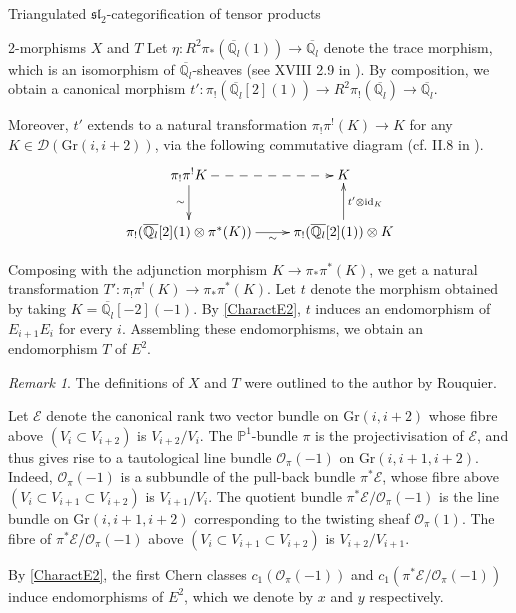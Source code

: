 \documentclass[12pt]{amsart}
\theoremstyle{definition}
\theoremstyle{remark}
\newtheorem{rmk}[thm]{Remark}
\theoremstyle{remark}
\begin{document}
\begin{section}{Triangulated $\mathfrak{sl}_{2}$-categorification of tensor products}
\begin{subsection}{2-morphisms $X$ and $T$}
Let $\eta \colon R^{2}\pi_{*}(\overline{\mathbb{Q}_{l}}(1)) \rightarrow \overline{\mathbb{Q}_{l}}$ denote the trace morphism, which is an isomorphism of $\overline{\mathbb{Q}_{l}}$-sheaves (see XVIII 2.9 in \cite{ArtinDeligneGrothendieckSaintDonatVerdierSGA4Tome3}). By composition, we obtain a canonical morphism $t' \colon \pi_{!}(\overline{\mathbb{Q}_{l}}[2](1)) \rightarrow R^{2}\pi_{!}(\overline{\mathbb{Q}_{l}}) \rightarrow \overline{\mathbb{Q}_{l}}$.

Moreover, $t'$ extends to a natural transformation $\pi_{!}\pi^{!}(K) \rightarrow K$ for any $K \in \mathcal{D}(\text{Gr}(i,i+2))$, via the following commutative diagram (cf. II.8 in \cite{KiehlWeissauerWeilConjecturesPerverseSheaveslAdicFourierTransform}). \[ \xymatrix{ \pi_{!}\pi^{!} K \ar[d]_-{\sim} \ar@{-->}[r] & K \\ \pi_{!}(\overline{\mathbb{Q}_{l}}[2](1) \otimes \pi^{*}(K)) \ar[r]_-{\sim} & \pi_{!}(\overline{\mathbb{Q}_{l}}[2](1)) \otimes K \ar[u]_-{t' \otimes \text{id}_{K}} } \]

Composing with the adjunction morphism $K \rightarrow \pi_{*}\pi^{*}(K)$, we get a natural transformation $T' \colon \pi_{!} \pi^{!}(K) \rightarrow \pi_{*} \pi^{*}(K)$. Let $t$ denote the morphism obtained by taking $K = \overline{\mathbb{Q}_{l}}[-2](-1)$. By \ref{CharactE2}, $t$ induces an endomorphism of $E_{i+1}E_{i}$ for every $i$. Assembling these endomorphisms, we obtain an endomorphism $T$ of $E^{2}$.  

\begin{rmk} The definitions of $X$ and $T$ were outlined to the author by Rouquier. \end{rmk}

Let $\mathscr{E}$ denote the canonical rank two vector bundle on $\text{Gr}(i,i+2)$ whose fibre above $(V_{i} \subset V_{i+2})$ is $V_{i+2} / V_{i}$. The $\mathbb{P}^{1}$-bundle $\pi$ is the projectivisation of $\mathscr{E}$, and thus gives rise to a tautological line bundle $\mathcal{O}_{\pi}(-1)$ on $\text{Gr}(i,i+1,i+2)$. Indeed, $\mathcal{O}_{\pi}(-1)$ is a subbundle of the pull-back bundle $\pi^{*}\mathscr{E}$, whose fibre above $(V_{i} \subset V_{i+1} \subset V_{i+2})$ is $V_{i+1} / V_{i}$. The quotient bundle $\pi^{*} \mathscr{E} / \mathcal{O}_{\pi}(-1)$ is the line bundle on $\text{Gr}(i,i+1,i+2)$ corresponding to the twisting sheaf $\mathcal{O}_{\pi}(1)$. The fibre of $\pi^{*} \mathscr{E} / \mathcal{O}_{\pi}(-1)$ above $(V_{i} \subset V_{i+1} \subset V_{i+2})$ is $V_{i+2} / V_{i+1}$. 

By \ref{CharactE2}, the first Chern classes $c_{1}(\mathcal{O}_{\pi}(-1))$ and $c_{1}(\pi^{*} \mathscr{E} / \mathcal{O}_{\pi}(-1))$ induce endomorphisms of $E^{2}$, which we denote by $x$ and $y$ respectively.


\end{subsection}
\end{section}
\end{document}
